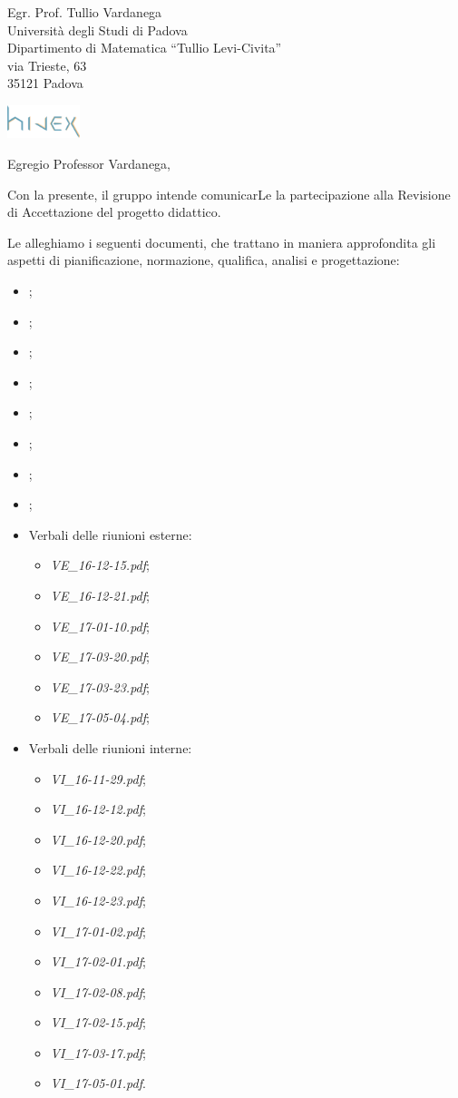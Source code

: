 \documentclass[a4paper]{letter} %
\date{Padova, \today}
\begin{document}
\begin{letter}{Egr. Prof. Tullio Vardanega\\
Università degli Studi di Padova\\
Dipartimento di Matematica “Tullio Levi-Civita”\\
via Trieste, 63\\
35121 Padova}

\includegraphics[width=80px]{../../util/hivex_logo3.png}

\opening{Egregio Professor Vardanega,}

Con la presente, il gruppo \hx{} intende comunicarLe la partecipazione alla Revisione di Accettazione del progetto didattico.

Le alleghiamo i seguenti documenti, che trattano in maniera approfondita gli aspetti di pianificazione, normazione, qualifica, analisi e progettazione:
\begin{itemize}
	\item \NdP;
	\item \PdP;
	\item \PdQ;
	\item \AdR;
	\item \ST;
	\item \DP;
	\item \Glossario;
	\item \MU;
	\item Verbali delle riunioni esterne:
	\begin{itemize}
		\item \emph{VE\_16-12-15.pdf};
		\item \emph{VE\_16-12-21.pdf};
		\item \emph{VE\_17-01-10.pdf};
		\item \emph{VE\_17-03-20.pdf};
		\item \emph{VE\_17-03-23.pdf};
		\item \emph{VE\_17-05-04.pdf}; %
	\end{itemize}
	\item Verbali delle riunioni interne:
	\begin{itemize}
		\item \emph{VI\_16-11-29.pdf};
		\item \emph{VI\_16-12-12.pdf};
		\item \emph{VI\_16-12-20.pdf};
		\item \emph{VI\_16-12-22.pdf};
		\item \emph{VI\_16-12-23.pdf};
		\item \emph{VI\_17-01-02.pdf};
		\item \emph{VI\_17-02-01.pdf};
		\item \emph{VI\_17-02-08.pdf};
		\item \emph{VI\_17-02-15.pdf};
		\item \emph{VI\_17-03-17.pdf};
		\item \emph{VI\_17-05-01.pdf}.
	\end{itemize}
\end{itemize}


\end{letter}
\end{document}
